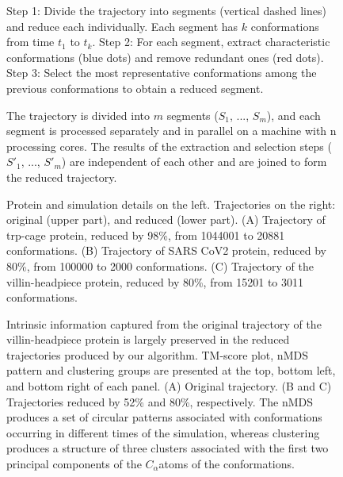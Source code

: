 \documentclass[twocolumn]{bmcart}%
\begin{document}
\begin{backmatter}
\begin{figure}[th]
\caption{ Step 1: Divide the trajectory into segments (vertical dashed lines) and reduce each individually. Each segment has $k$ conformations from time $t_{1}$ to $t_{k}$. Step 2: For each segment, extract characteristic conformations (blue dots) and remove redundant ones (red dots). Step 3: Select the most representative conformations among the previous conformations to obtain a reduced segment. \label{fig:Algorithm-Description}}
\end{figure}

\begin{figure}[th]
\caption{ The trajectory is divided into $m$ segments ($S_{1}$, ..., $S_{m}$), and each segment is processed separately and in parallel on a machine with n processing cores. The results of the extraction and selection steps ($S'_{1}$, ..., $S'_{m}$) are independent of each other and are joined to form the reduced trajectory.\label{fig:Algorithm-Parallel}}
\end{figure}


\begin{figure}[!t]
\caption{ Protein and simulation details on the left. Trajectories on the right: original (upper part), and reduced (lower part). (A) Trajectory of trp-cage protein, reduced by 98\%, from 1044001 to 20881 conformations. (B) Trajectory of SARS CoV2 protein, reduced by 80\%, from 100000 to 2000 conformations. (C) Trajectory of the villin-headpiece protein, reduced by 80\%, from 15201 to 3011 conformations. \label{fig:Trajectory-Results}}
\end{figure}

\begin{figure}[!th]
\caption{ Intrinsic information captured from the original trajectory of the villin-headpiece protein is largely preserved in the reduced trajectories produced by our algorithm. TM-score plot, nMDS pattern and clustering groups are presented at the top, bottom left, and bottom right of each panel. (A) Original trajectory. (B and C) Trajectories reduced by 52\% and 80\%, respectively. The nMDS produces a set of circular patterns associated with conformations occurring in different times of the simulation, whereas clustering produces a structure of three clusters associated with the first two principal components of the $C_{\alpha}$atoms of the conformations. \label{fig:Comparaciones-PCA-nMDS}}
\end{figure}


\end{backmatter}
\end{document}
